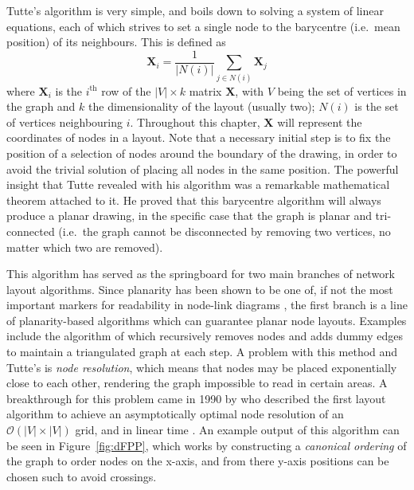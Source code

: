 Tutte's algorithm is very simple, and boils down to solving a system of linear equations, each of which strives to set a single node to the barycentre (i.e.\ mean position) of its neighbours. This is defined as 
\begin{equation}
  \mathbf{X}_i = \frac{1}{|N(i)|}\sum_{j\in N(i)}\mathbf{X}_j
\label{eq:tutte}
\end{equation}
where $\mathbf{X}_i$ is the $i^\text{th}$ row of the $|V|\times k$ matrix $\mathbf{X}$, with $V$ being the set of vertices in the graph and $k$ the dimensionality of the layout (usually two); $N(i)$ is the set of vertices neighbouring $i$.
Throughout this chapter, $\mathbf{X}$ will represent the coordinates of nodes in a layout.
Note that a necessary initial step is to fix the position of a selection of nodes around the boundary of the drawing, in order to avoid the trivial solution of placing all nodes in the same position.
The powerful insight that Tutte revealed with his algorithm was a remarkable mathematical theorem attached to it. He proved that this barycentre algorithm will always produce a planar drawing, in the specific case that the graph is planar and tri-connected (i.e.\ the graph cannot be disconnected by removing two vertices, no matter which two are removed).

This algorithm has served as the springboard for two main branches of network layout algorithms. Since planarity has been shown to be one of, if not the most important markers for readability in node-link diagrams \citep{Purchase1997}, the first branch is a line of planarity-based algorithms which can guarantee planar node layouts. Examples include the algorithm of \citet{Read1987} which recursively removes nodes and adds dummy edges to maintain a triangulated graph at each step.  A problem with this method and Tutte's is \emph{node resolution}, which means that nodes may be placed exponentially close to each other, rendering the graph impossible to read in certain areas.
A breakthrough for this problem came in 1990 by \citet{DeFraysseix1990} who described the first layout algorithm to achieve an asymptotically optimal node resolution of an $\mathcal{O}(|V|\times |V|)$ grid, and in linear time \citep{Chrobak1995}.
An example output of this algorithm can be seen in Figure~\ref{fig:dFPP}, which works by constructing a \emph{canonical ordering} of the graph \citep{Zhang2005} to order nodes on the x-axis, and from there y-axis positions can be chosen such to avoid crossings.

